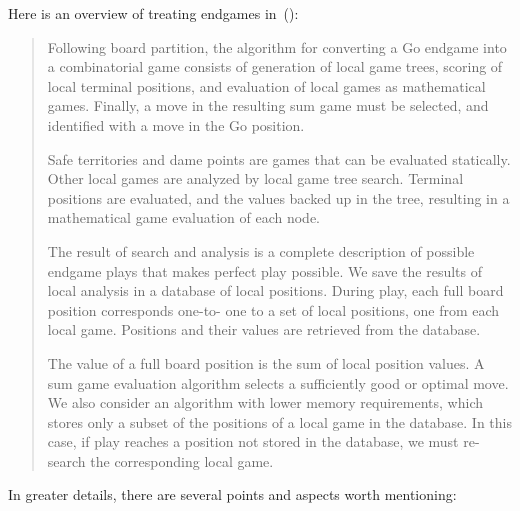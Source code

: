 Here is an overview of treating endgames in~(\cite{Muller1995computer}):
\begin{quotation} \noindent
  Following board partition, the algorithm for converting a Go endgame into a combinatorial game consists of generation of local game trees, scoring of local terminal positions, and evaluation of local games as mathematical games.
  Finally, a move in the resulting sum game must be selected, and identified with a move in the Go position.

  Safe territories and dame points are games that can be evaluated statically.
  Other local games are analyzed by local game tree search.
  Terminal positions are evaluated, and the values backed up in the tree, resulting in a mathematical game evaluation of each node.

  The result of search and analysis is a complete description of possible endgame plays that makes perfect play possible.
  We save the results of local analysis in a database of local positions.
  During play, each full board position corresponds one-to- one to a set of local positions, one from each local game.
  Positions and their values are retrieved from the database.

  The value of a full board position is the sum of local position values.
  A sum game evaluation algorithm selects a sufficiently good or optimal move.
  We also consider an algorithm with lower memory requirements, which stores only a subset of the positions of a local game in the database.
  In this case, if play reaches a position not stored in the database, we must re-search the corresponding local game.
\end{quotation}
In greater details, there are several points and aspects worth mentioning:
